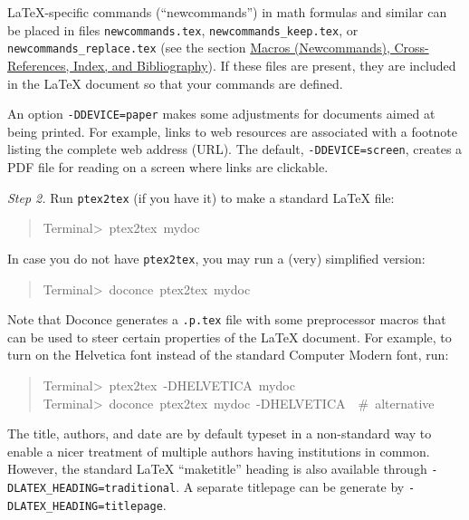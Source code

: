 \documentclass[a4paper]{article}
\begin{document}
LaTeX-specific commands (``newcommands'') in math formulas and similar
can be placed in files \texttt{newcommands.tex}, \texttt{newcommands\_keep.tex}, or
\texttt{newcommands\_replace.tex} (see the section \hyperref[macros-newcommands-cross-references-index-and-bibliography]{Macros (Newcommands), Cross-References, Index, and Bibliography}).
If these files are present, they are included in the LaTeX document
so that your commands are defined.

An option \texttt{-DDEVICE=paper} makes some adjustments for documents
aimed at being printed. For example, links to web resources are
associated with a footnote listing the complete web address (URL).
The default, \texttt{-DDEVICE=screen}, creates a PDF file for reading
on a screen where links are clickable.

\emph{Step 2.} Run \texttt{ptex2tex} (if you have it) to make a standard LaTeX file:
%
\begin{quote}{\ttfamily \raggedright \noindent
Terminal>~ptex2tex~mydoc
}
\end{quote}

In case you do not have \texttt{ptex2tex}, you may run a (very) simplified version:
%
\begin{quote}{\ttfamily \raggedright \noindent
Terminal>~doconce~ptex2tex~mydoc
}
\end{quote}

Note that Doconce generates a \texttt{.p.tex} file with some preprocessor macros
that can be used to steer certain properties of the LaTeX document.
For example, to turn on the Helvetica font instead of the standard
Computer Modern font, run:
%
\begin{quote}{\ttfamily \raggedright \noindent
Terminal>~ptex2tex~-DHELVETICA~mydoc\\
Terminal>~doconce~ptex2tex~mydoc~-DHELVETICA~~\#~alternative
}
\end{quote}

The title, authors, and date are by default typeset in a non-standard
way to enable a nicer treatment of multiple authors having
institutions in common. However, the standard LaTeX ``maketitle'' heading
is also available through \texttt{-DLATEX\_HEADING=traditional}.
A separate titlepage can be generate by
\texttt{-DLATEX\_HEADING=titlepage}.
\end{document}
